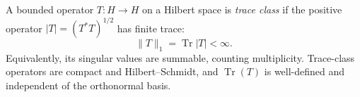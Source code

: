 
A bounded operator $T:H\to H$ on a Hilbert space is \emph{trace class} if the positive operator $|T|=(T^*T)^{1/2}$ has finite trace:
\[
\|T\|_1=\operatorname{Tr}|T|<\infty.
\]
Equivalently, its singular values are summable, counting multiplicity. Trace-class operators are compact and Hilbert--Schmidt, and $\operatorname{Tr}(T)$ is well-defined and independent of the orthonormal basis.
